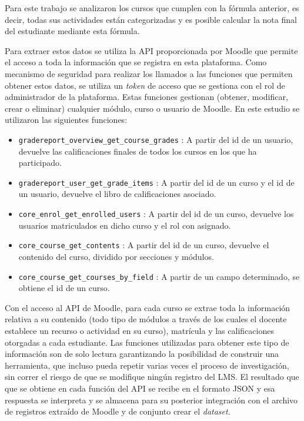 Para este trabajo se analizaron los cursos que cumplen con la fórmula anterior, es decir, todas sus actividades están categorizadas y es posible calcular la nota final del estudiante mediante esta fórmula.  


Para extraer estos datos se utiliza la API proporcionada por Moodle que permite el acceso a toda la información que se registra en esta plataforma. Como mecanismo de seguridad para realizar los llamados a las funciones que permiten obtener estos datos, se utiliza un \textit{token} de acceso que se gestiona con el rol de administrador de la plataforma. Estas funciones gestionan (obtener, modificar, crear o eliminar) cualquier módulo, curso o usuario de Moodle. En este estudio se utilizaron las siguientes funciones:  


\begin{itemize}
    \item \texttt{gradereport\_overview\_get\_course\_grades} : A partir del id de un usuario, devuelve las calificaciones finales de todos los cursos en los que ha participado.
    \item \texttt{gradereport\_user\_get\_grade\_items} : A partir del id de un curso y el id de un usuario, devuelve el libro de calificaciones asociado.
    \item \texttt{core\_enrol\_get\_enrolled\_users} : A partir del id de un curso, devuelve los usuarios matriculados en dicho curso y el rol con asignado.
    \item \texttt{core\_course\_get\_contents} : A partir del id de un curso, devuelve el contenido del curso, dividido por secciones y módulos.
    \item \texttt{core\_course\_get\_courses\_by\_field} : A partir de un campo determinado, se obtiene el id de un curso.
\end{itemize}
    
Con el acceso al API de Moodle, para cada curso se extrae toda la información relativa a su contenido (todo tipo de módulos a través de los cuales el docente establece un recurso o actividad en su curso), matrícula y las calificaciones otorgadas a cada estudiante. Las funciones utilizadas para obtener este tipo de información son de solo lectura garantizando la posibilidad de construir una herramienta, que incluso pueda repetir varias veces el proceso de investigación, sin correr el riesgo de que se modifique ningún registro del LMS. El resultado que que se obtiene en cada función del API se recibe en el formato JSON y esa respuesta se interpreta y se almacena para su posterior integración con el archivo de registros extraído de Moodle y de conjunto crear el \textit{dataset}. 

